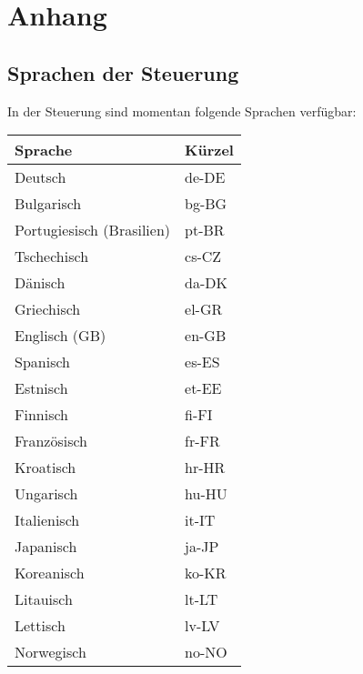 \chapter*{Anhang}
\label{anhang}
\renewcommand{\thesection}{A} %

\section{Sprachen der Steuerung}
\label{anh_sec:steuerung_sprachen}
In der Steuerung sind momentan folgende Sprachen verfügbar: 

\begin{longtable}[h]{ | p{5cm} | P{2cm} | }	\hline
	\label{table:sprachen_steuerung}
	\small
	\renewcommand{\arraystretch}{1.5}
	\setlength{\arrayrulewidth}{0.4mm}
	\vspace{.75\baselineskip}
	\textbf{Sprache} & \textbf{Kürzel} \\
	\hline		
	Deutsch						& de-DE \\
	\hline
	Bulgarisch 					& bg-BG \\
	\hline
	Portugiesisch (Brasilien)	& pt-BR \\
	\hline
	Tschechisch 				& cs-CZ \\
	\hline
	Dänisch						& da-DK \\
	\hline
	Griechisch 					& el-GR \\
	\hline
	Englisch (GB)				& en-GB \\
	\hline
	Spanisch					& es-ES \\
	\hline
	Estnisch					& et-EE \\
	\hline
	Finnisch					& fi-FI \\
	\hline
	Französisch					& fr-FR \\
	\hline
	Kroatisch					& hr-HR \\
	\hline
	Ungarisch					& hu-HU \\
	\hline
	Italienisch					& it-IT \\
	\hline
	Japanisch					& ja-JP \\
	\hline
	Koreanisch					& ko-KR \\
	\hline
	Litauisch					& lt-LT \\
	\hline
	Lettisch					& lv-LV \\
	\hline
	Norwegisch 					& no-NO \\

\end{longtable}
